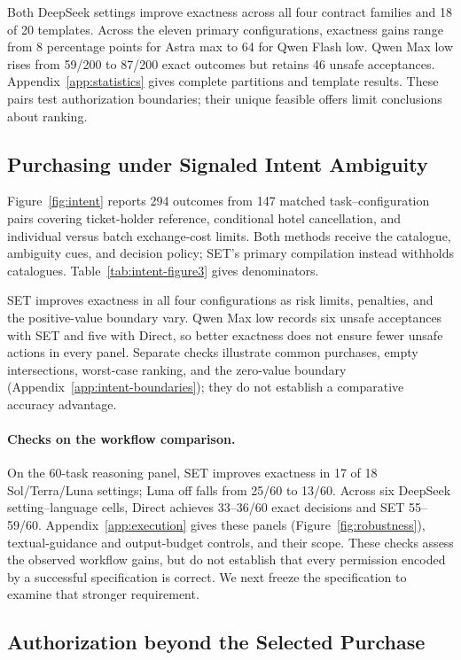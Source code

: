 Both DeepSeek settings improve exactness across all four contract families and 18 of 20 templates. Across the eleven primary configurations, exactness gains range from 8 percentage points for Astra max to 64 for Qwen Flash low. Qwen Max low rises from 59/200 to 87/200 exact outcomes but retains 46 unsafe acceptances. Appendix~\ref{app:statistics} gives complete partitions and template results. These pairs test authorization boundaries; their unique feasible offers limit conclusions about ranking.

\subsection{Purchasing under Signaled Intent Ambiguity}
\label{sec:intent-decisions}
Figure~\ref{fig:intent} reports 294 outcomes from 147 matched task--configuration pairs covering ticket-holder reference, conditional hotel cancellation, and individual versus batch exchange-cost limits. Both methods receive the catalogue, ambiguity cues, and decision policy; SET's primary compilation instead withholds catalogues. Table~\ref{tab:intent-figure3} gives denominators.

SET improves exactness in all four configurations as risk limits, penalties, and the positive-value boundary vary. Qwen Max low records six unsafe acceptances with SET and five with Direct, so better exactness does not ensure fewer unsafe actions in every panel. Separate checks illustrate common purchases, empty intersections, worst-case ranking, and the zero-value boundary (Appendix~\ref{app:intent-boundaries}); they do not establish a comparative accuracy advantage.

\paragraph{Checks on the workflow comparison.}
\label{sec:robustness}
On the 60-task reasoning panel, SET improves exactness in 17 of 18 Sol/Terra/Luna settings; Luna off falls from 25/60 to 13/60. Across six DeepSeek setting--language cells, Direct achieves 33--36/60 exact decisions and SET 55--59/60. Appendix~\ref{app:execution} gives these panels (Figure~\ref{fig:robustness}), textual-guidance and output-budget controls, and their scope. These checks assess the observed workflow gains, but do not establish that every permission encoded by a successful specification is correct. We next freeze the specification to examine that stronger requirement.

\subsection{Authorization beyond the Selected Purchase}
\label{sec:permissions}
\label{sec:components}

